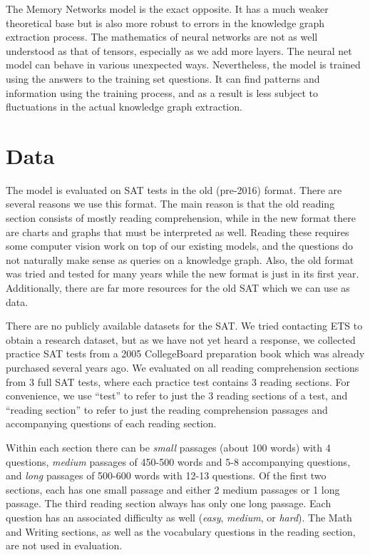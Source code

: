 \documentclass[pageno]{final_paper}
\begin{document}
The Memory Networks model is the exact opposite. It has a much weaker
theoretical base but is also more robust to errors in the knowledge graph
extraction process. The mathematics of neural networks are not as well
understood as that of tensors, especially as we add more layers. The neural net
model can behave in various unexpected ways. Nevertheless, the model is trained
using the answers to the training set questions. It can find patterns and
information using the training process, and as a result is less subject to
fluctuations in the actual knowledge graph extraction.

\section{Data}
\label{Data}

The model is evaluated on SAT tests in the old (pre-2016) format. There are
several reasons we use this format. The main reason is that the old reading
section consists of mostly reading comprehension, while in the new format there
are charts and graphs that must be interpreted as well. Reading these requires
some computer vision work on top of our existing models, and the questions do
not naturally make sense as queries on a knowledge graph. Also, the old format
was tried and tested for many years while the new format is just in its first
year. Additionally, there are far more resources for the old SAT which we can
use as data.

There are no publicly available datasets for the SAT. We tried contacting ETS to
obtain a research dataset, but as we have not yet heard a response, we collected
practice SAT tests from a 2005 CollegeBoard preparation book which was already
purchased several years ago. We evaluated on all reading comprehension sections
from 3 full SAT tests, where each practice test contains 3 reading sections. For
convenience, we use ``test'' to refer to just the 3 reading sections of a test,
and ``reading section'' to refer to just the reading comprehension passages and
accompanying questions of each reading section.

Within each section there can be \textit{small} passages (about 100 words) with
4 questions, \textit{medium} passages of 450-500 words and 5-8 accompanying
questions, and \textit{long} passages of 500-600 words with 12-13 questions. Of
the first two sections, each has one small passage and either 2 medium passages
or 1 long passage. The third reading section always has only one long passage.
Each question has an associated difficulty as well (\textit{easy},
\textit{medium}, or \textit{hard}). The Math and Writing sections, as well as
the vocabulary questions in the reading section, are not used in evaluation.
\end{document}
